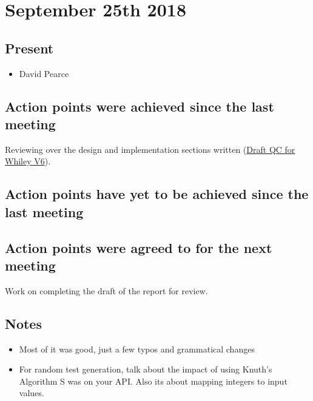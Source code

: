 \documentclass[]{article}
\begin{document}
\section{September 25th 2018}
\subsection{Present}
\begin{itemize}
	\item David Pearce
\end{itemize}

\subsection{Action points were achieved since the last meeting}
Reviewing over the design and implementation sections written (\href{https://gitlab.ecs.vuw.ac.nz/project489-2018/chinjani/quickcheck-for-whiley-final-report/blob/master/Draft%20V6%20QuickCheck%20for%20Whiley%20-%20Janice%20Chin.pdf}{Draft QC for Whiley V6}). 
\subsection{Action points have yet to be achieved since the last meeting}
\subsection{Action points were agreed to for the next meeting}
Work on completing the draft of the report for review.

\subsection{Notes}
\begin{itemize}
	\item Most of it was good, just a few typos and grammatical changes
	\item For random test generation, talk about the impact of using Knuth's Algorithm S was on your API. Also its about mapping integers to input values.
\end{itemize}
\end{document}
